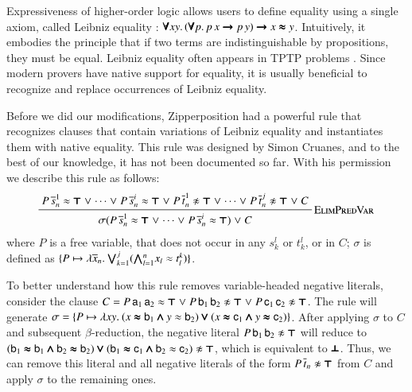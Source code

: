 Expressiveness of higher-order logic allows users to define equality using a single axiom,
called Leibniz equality \cite{pa-01-classical-ty-thy}:
%
$ \pmb{\forall} xy. \,
   (\pmb{\forall} p. \, p \, x \pmb{\rightarrow} p \, y) \pmb{\rightarrow} x \pmb{\approx} y$.
%
Intuitively, it embodies the principle that if two terms are indistinguishable by propositions,
they must be equal.
Leibniz equality often appears in TPTP problems  \cite{gs-17-tptp}. Since modern provers have native support
for equality, it is usually beneficial to recognize and replace occurrences of Leibniz equality.

Before we did our modifications, Zipperposition had a powerful rule that
recognizes clauses that contain variations of Leibniz equality and instantiates
them with native equality. This rule was designed by Simon Cruanes, and to the
best of our knowledge, it has not been documented so far. With his permission
we describe this rule as follows:
\pagebreak[2]
%
$$\namedinference{ElimPredVar}{P \, \overline{s}_n^1 \eq \itrue \llor \cdots \llor
    P \, \overline{s}_n^i \eq \itrue \llor P \, \overline{t}_n^1 \noteq \itrue \llor
    \cdots \llor P \, \overline{t}_n^j \noteq \itrue \llor C} 
    {\sigmacl{P \, \overline{s}_n^1
    \eq \itrue \llor \cdots \llor P \, \overline{s}_n^i \eq \itrue} \llor C} $$
where $P$ is a free variable, that does not occur in any $s_k^l$ or $t_k^l$, or
in $C$; $\sigma$ is defined as $\{ P \mapsto \lambda \overline{x}_{n}.\> \pmb{\bigvee}_{k=1}^{j}
(\pmb{\bigwedge}_{l=1}^{n} x_l \approx t^k_l )  \}$. 

To better understand how this rule removes variable-headed negative literals,
consider the clause $C = P \, \mathsf{a}_1 \, \mathsf{a}_2 \approx \pmb{\top} \mathrel\lor P \,
\mathsf{b}_1 \, \mathsf{b}_2 \not\approx \pmb{\top} \mathrel\lor P \, \mathsf{c}_1 \, \mathsf{c}_2 \not\approx
\pmb{\top}$. The rule 
will generate $\sigma = \{ P \mapsto \lambda xy.\> (x \pmb{\approx} \mathsf{b}_1
\pmb{\land} y \approx \mathsf{b}_2) \pmb{\lor} (x \pmb{\approx} \mathsf{c}_1 \pmb{\land} y \pmb{\approx} \mathsf{c}_2)   \}$.
After applying $\sigma$ to $C$ and subsequent $\beta$-reduction, the negative literal
$  P \, \mathsf{b}_1 \, \mathsf{b}_2 \not\approx \pmb{\top}$ will reduce to 
$ (\cst{b}_1 \ieq \cst{b}_1 \iand \cst{b}_2 \ieq \cst{b}_2) \ior (\cst{b}_1 \ieq \cst{c}_1 \iand \cst{b}_2 \eq \cst{c}_2) \noteq \itrue $,
which is equivalent to $\pmb{\bot}$. Thus, we can remove this literal and all negative literals
of the form $P \, \overline{t}_n \noteq \itrue$ from $C$ and apply $\sigma$ to the remaining ones.

